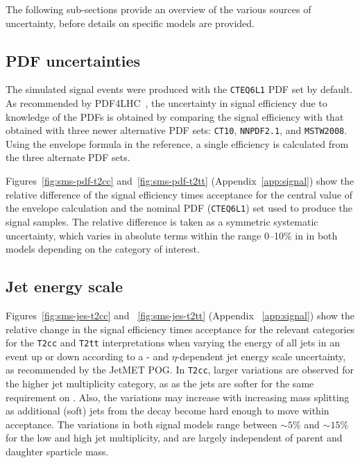 The following sub-sections provide an overview of the various sources of
uncertainty, before details on specific models are provided. 

\subsection{PDF uncertainties\label{sec:pdf-sets}}

The simulated signal events were produced with the \verb!CTEQ6L1! PDF
set by default.  As recommended by PDF4LHC~\cite{pdf4lhc}, the uncertainty
in signal efficiency due to knowledge of the PDFs is obtained by comparing 
the signal efficiency with that obtained with three newer alternative PDF 
sets: \verb!CT10!, \verb!NNPDF2.1!, and \verb!MSTW2008!. Using the envelope
formula in the reference, a single efficiency is calculated from the three alternate
PDF sets. 

Figures~\ref{fig:sms-pdf-t2cc} and~\ref{fig:sms-pdf-t2tt} 
(Appendix~\ref{app:signal}) show the relative difference of the signal 
efficiency times acceptance for the central value of the envelope calculation 
and the nominal PDF (\verb!CTEQ6L1!) set used to produce the signal 
samples. The relative difference is taken as a symmetric systematic 
uncertainty, which varies in absolute terms within the range 0--10\% in 
in both models depending on the category of interest.

\subsection{Jet energy scale\label{sec:sms-syst-jes}}

Figures~\ref{fig:sms-jes-t2cc} and ~\ref{fig:sms-jes-t2tt} 
(Appendix ~\ref{app:signal}) show the relative change in the 
signal efficiency times acceptance for the relevant categories for 
the \verb!T2cc! and \verb!T2tt! interpretations when varying the energy 
of all jets in an event up or down according to a \pt- and $\eta$-dependent 
jet energy scale uncertainty, as recommended by the JetMET POG. 
In \verb!T2cc!, larger variations are observed for the higher 
jet multiplicity category, as as the jets are softer for the same 
requirement on \scalht. Also, the variations may increase with 
increasing mass splitting as additional (soft) jets from the decay 
become hard enough to move within acceptance. The variations in both 
signal models range between $\sim5\%$ and $\sim15\%$ for the low 
and high jet multiplicity, and are largely independent of parent 
and daughter sparticle mass. 

